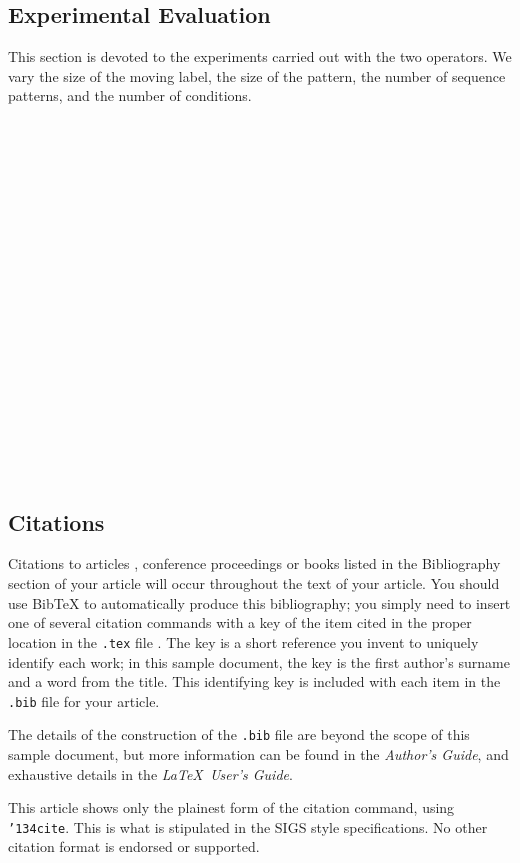 \documentclass{sig-alternate}
\begin{document}
\subsection{Experimental Evaluation}
This section is devoted to the experiments carried out with the two operators. We vary the size of the moving label, the size of the pattern, the number of sequence patterns, and the number of conditions.
\\ \\ \\ \\ \\ \\ \\ \\ \\ \\ \\ \\ \\ \\ \\ \\ \\ \\ \\ \\ 
\newpage

\subsection{Citations}
Citations to articles \cite{bowman:reasoning,
clark:pct, braams:babel, herlihy:methodology},
conference proceedings \cite{clark:pct} or
books \cite{salas:calculus, Lamport:LaTeX} listed
in the Bibliography section of your
article will occur throughout the text of your article.
You should use BibTeX to automatically produce this bibliography;
you simply need to insert one of several citation commands with
a key of the item cited in the proper location in
the \texttt{.tex} file \cite{Lamport:LaTeX}.
The key is a short reference you invent to uniquely
identify each work; in this sample document, the key is
the first author's surname and a
word from the title.  This identifying key is included
with each item in the \texttt{.bib} file for your article.

The details of the construction of the \texttt{.bib} file
are beyond the scope of this sample document, but more
information can be found in the \textit{Author's Guide},
and exhaustive details in the \textit{\LaTeX\ User's
Guide}\cite{Lamport:LaTeX}.

This article shows only the plainest form
of the citation command, using \texttt{{\char'134}cite}.
This is what is stipulated in the SIGS style specifications.
No other citation format is endorsed or supported.
\end{document}
